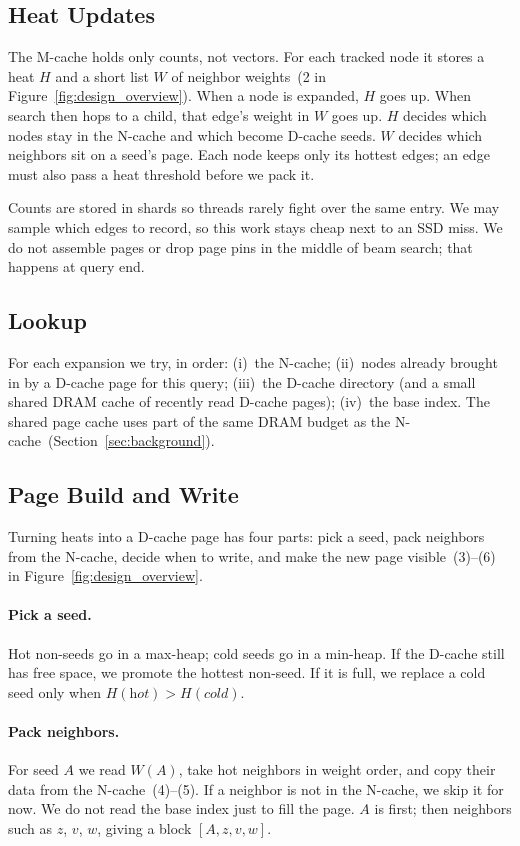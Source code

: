 \subsection{Heat Updates}
\label{sec:design_heat}
The M-cache holds only counts, not vectors.
For each tracked node it stores a heat $H$ and a short list $W$ of neighbor weights~(2 in Figure~\ref{fig:design_overview}).
When a node is expanded, $H$ goes up.
When search then hops to a child, that edge's weight in $W$ goes up.
$H$ decides which nodes stay in the N-cache and which become D-cache seeds.
$W$ decides which neighbors sit on a seed's page.
Each node keeps only its hottest edges; an edge must also pass a heat threshold before we pack it.

Counts are stored in shards so threads rarely fight over the same entry.
We may sample which edges to record, so this work stays cheap next to an SSD miss.
We do not assemble pages or drop page pins in the middle of beam search; that happens at query end.

\subsection{Lookup}
\label{sec:design_lookup}
For each expansion we try, in order:
(i)~the N-cache;
(ii)~nodes already brought in by a D-cache page for this query;
(iii)~the D-cache directory (and a small shared DRAM cache of recently read D-cache pages);
(iv)~the base index.
The shared page cache uses part of the same DRAM budget as the N-cache~(Section~\ref{sec:background}).

\subsection{Page Build and Write}
\label{sec:design_assemble}
Turning heats into a D-cache page has four parts: pick a seed, pack neighbors from the N-cache, decide when to write, and make the new page visible~(3)--(6) in Figure~\ref{fig:design_overview}.

\paragraph{Pick a seed.}
Hot non-seeds go in a max-heap; cold seeds go in a min-heap.
If the D-cache still has free space, we promote the hottest non-seed.
If it is full, we replace a cold seed only when $H(\textit{hot})>H(\textit{cold})$.

\paragraph{Pack neighbors.}
For seed $A$ we read $W(A)$, take hot neighbors in weight order, and copy their data from the N-cache~(4)--(5).
If a neighbor is not in the N-cache, we skip it for now.
We do not read the base index just to fill the page.
$A$ is first; then neighbors such as $z$, $v$, $w$, giving a block $[A,z,v,w]$.

